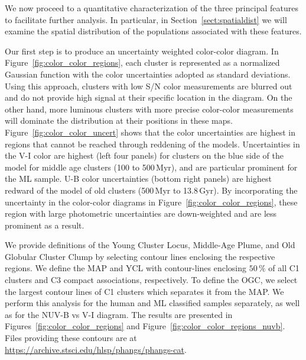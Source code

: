 \documentclass[linenumbers]{aastex63}
\begin{document}
We now proceed to a quantitative characterization of the three principal features to facilitate further analysis. In particular, in Section~\ref{sect:spatialdist} we will examine the spatial distribution of the populations associated with these features. 

Our first step is to produce an uncertainty weighted color-color diagram. In Figure~\ref{fig:color_color_regions}, each cluster is represented as a 
normalized Gaussian function with the color uncertainties adopted as standard deviations. Using this approach, clusters with low S/N color measurements are blurred out and do not provide high signal at their specific location in the diagram. On the other hand, more luminous clusters with more precise color-color measurements will dominate the distribution at their positions in these maps.  Figure~\ref{fig:color_color_uncert} shows that the color uncertainties are highest in regions that cannot be reached through reddening of the  models.
Uncertainties in the V-I color are highest (left four panels) for clusters on the blue side of the  model for middle age clusters (100 to 500\,Myr), and are particular prominent for the ML sample.   U-B color uncertainties (bottom right panels) are highest redward of the  model of old clusters (500\,Myr to 13.8\,Gyr). By incorporating the uncertainty in the color-color diagrams in Figure~\ref{fig:color_color_regions}, these region with large photometric uncertainties are down-weighted and are less prominent as a result.  










We provide definitions of the Young Cluster Locus, Middle-Age Plume, and Old Globular Cluster Clump by selecting contour lines enclosing the respective regions.
We define the MAP and YCL with contour-lines enclosing $50\,\%$ of all C1 clusters and C3 compact associations, respectively. 
To define the OGC, we select the largest contour lines of C1 clusters which separates it from the MAP. We perform this analysis for the human and ML classified samples separately, as well as for the NUV-B vs V-I diagram.  The results are presented in  Figures~\ref{fig:color_color_regions} and Figure~\ref{fig:color_color_regions_nuvb}. Files providing these contours are at \url{https://archive.stsci.edu/hlsp/phangs/phangs-cat}.
\end{document}
